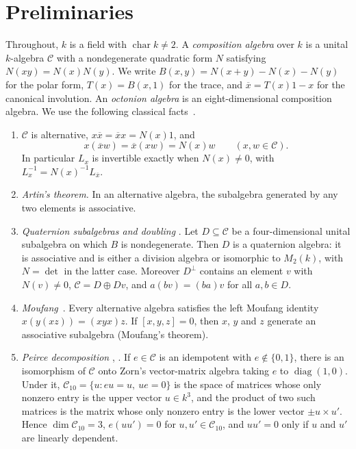 \documentclass[11pt]{amsart}
\theoremstyle{definition}
\theoremstyle{remark}
\newcommand{\C}{\mathcal{C}}
\newcommand{\conj}[1]{\overline{#1}}
\newcommand{\assoc}[3]{[#1,#2,#3]}
\begin{document}
\section{Preliminaries}\label{sec:prelim}

Throughout, $k$ is a field with $\operatorname{char}k\neq2$. A
\emph{composition algebra} over $k$ is a unital $k$-algebra $\C$ with a
nondegenerate quadratic form $N$ satisfying $N(xy)=N(x)N(y)$. We write
$B(x,y)=N(x+y)-N(x)-N(y)$ for the polar form, $T(x)=B(x,1)$ for the trace,
and $\conj{x}=T(x)1-x$ for the canonical involution. An \emph{octonion
algebra} is an eight-dimensional composition algebra. We use the following
classical facts~\cite{schafer1966,springer2000}.

\begin{enumerate}[label=(F\arabic*)]
\item\label{F:comp} $\C$ is alternative, $x\conj{x}=\conj{x}x=N(x)1$, and
  \[
    x(\conj{x}w)=\conj{x}(xw)=N(x)w\qquad(x,w\in\C).
  \]
  In particular $L_x$ is invertible exactly when $N(x)\neq0$, with
  $L_x^{-1}=N(x)^{-1}L_{\conj{x}}$.
\item\label{F:artin} \emph{Artin's theorem.} In an alternative algebra, the
  subalgebra generated by any two elements is associative.
\item\label{F:double} \emph{Quaternion subalgebras and doubling}
  \cite[Ch.~1]{springer2000}. Let $D\subseteq\C$ be a four-dimensional unital
  subalgebra on which $B$ is nondegenerate. Then $D$ is a quaternion algebra:
  it is associative and is either a division algebra or isomorphic to
  $M_2(k)$, with $N=\det$ in the latter case. Moreover $D^\perp$ contains an
  element $v$ with $N(v)\neq0$, $\C=D\oplus Dv$, and $a(bv)=(ba)v$ for all
  $a,b\in D$.
\item\label{F:moufang} \emph{Moufang}~\cite[Ch.~III]{schafer1966}. Every
  alternative algebra satisfies the left Moufang identity
  $x(y(xz))=(xyx)z$. If $\assoc xyz=0$, then $x$, $y$ and $z$ generate an
  associative subalgebra (Moufang's theorem).
\item\label{F:zorn} \emph{Peirce decomposition}
  \cite{zorn1933}, \cite[Ch.~1]{springer2000}. If $e\in\C$ is an idempotent
  with $e\notin\{0,1\}$, there is an isomorphism of $\C$ onto Zorn's
  vector-matrix algebra taking $e$ to $\operatorname{diag}(1,0)$. Under it,
  $\C_{10}=\{u:eu=u,\ ue=0\}$ is the space of matrices whose only nonzero
  entry is the upper vector $u\in k^3$, and the product of two such matrices
  is the matrix whose only nonzero entry is the lower vector $\pm u\times u'$.
  Hence $\dim\C_{10}=3$, $e(uu')=0$ for $u,u'\in\C_{10}$, and $uu'=0$ only if
  $u$ and $u'$ are linearly dependent.
\end{enumerate}
\end{document}
